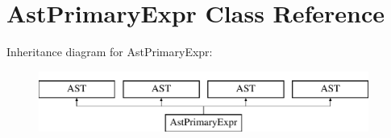 \hypertarget{classAstPrimaryExpr}{\section{Ast\-Primary\-Expr Class Reference}
\label{classAstPrimaryExpr}
}
Inheritance diagram for Ast\-Primary\-Expr\-:\begin{figure}[H]
\begin{center}
\leavevmode
\includegraphics[height=2.000000cm]{classAstPrimaryExpr}
\end{center}
\end{figure}
